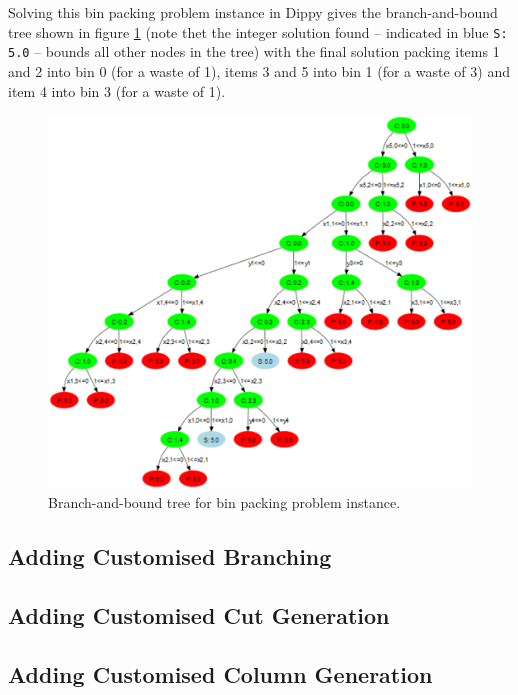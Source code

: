 Solving this bin packing problem instance in Dippy gives the branch-and-bound tree shown in figure \ref{fig:bpp_tree1} (note thet the integer solution found -- indicated in blue \lstinline{S: 5.0} -- bounds all other nodes in the tree) with the final solution packing items 1 and 2 into bin 0 (for a waste of 1), items 3 and 5 into bin 1 (for a waste of 3) and item 4 into bin 3 (for a waste of 1).
\begin{figure}[htp]
\begin{center}
\includegraphics[scale=0.16]{img/bpp_tree1.eps}
\end{center}
\caption{Branch-and-bound tree for bin packing problem instance.} \label{fig:bpp_tree1}
\end{figure}

\subsection{Adding Customised Branching} \label{sbs:branch}


\subsection{Adding Customised Cut Generation} \label{sbs:cuts}


\subsection{Adding Customised Column Generation} \label{sbs:column}



